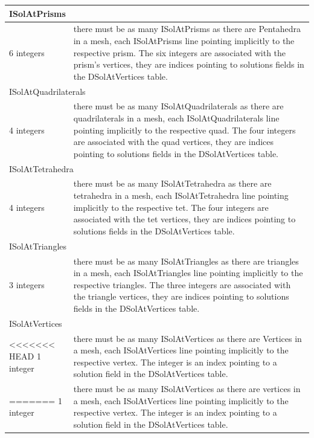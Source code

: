 \documentclass[a4paper,12pt]{article}
\begin{document}
\begin{longtable}{|m{4cm}|m{11cm}|}
\multicolumn{2}{|l|}{ISolAtPrisms} \\
\hline
6 integers & there must be as many ISolAtPrisms as there are Pentahedra in a mesh, each ISolAtPrisms line pointing implicitly to the respective prism. The six integers are associated with the prism's vertices, they are indices pointing to solutions fields in the DSolAtVertices table. \\
\hline\hline

\multicolumn{2}{|l|}{ISolAtQuadrilaterals} \\
\hline
4 integers & there must be as many ISolAtQuadrilaterals as there are quadrilaterals in a mesh, each ISolAtQuadrilaterals line pointing implicitly to the respective quad. The four integers are associated with the quad vertices, they are indices pointing to solutions fields in the DSolAtVertices table. \\
\hline\hline

\multicolumn{2}{|l|}{ISolAtTetrahedra} \\
\hline
4 integers & there must be as many ISolAtTetrahedra as there are tetrahedra in a mesh, each ISolAtTetrahedra line pointing implicitly to the respective tet. The four integers are associated with the tet vertices, they are indices pointing to solutions fields in the DSolAtVertices table. \\
\hline\hline

\multicolumn{2}{|l|}{ISolAtTriangles} \\
\hline
3 integers & there must be as many ISolAtTriangles as there are triangles in a mesh, each ISolAtTriangles line pointing implicitly to the respective triangles. The three integers are associated with the triangle vertices, they are indices pointing to solutions fields in the DSolAtVertices table. \\
\hline\hline

\multicolumn{2}{|l|}{ISolAtVertices} \\
\hline
<<<<<<< HEAD
1 integer & there must be as many ISolAtVertices as there are Vertices in a mesh, each ISolAtVertices line pointing implicitly to the respective vertex. The integer is an index pointing to a solution field in the DSolAtVertices table. \\
=======
1 integer & there must be as many ISolAtVertices as there are vertices in a mesh, each ISolAtVertices line pointing implicitly to the respective vertex. The integer is an index pointing to a solution field in the DSolAtVertices table. \\
\hline\hline


\end{longtable}
\end{document}

